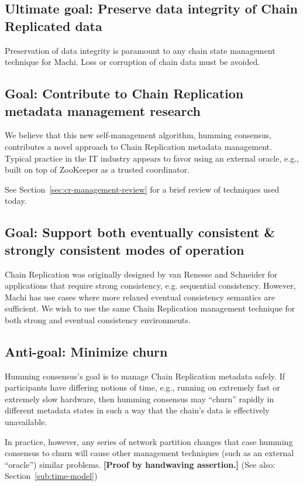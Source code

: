\documentclass[preprint,10pt]{sigplanconf}
\begin{document}
\subsection{Ultimate goal: Preserve data integrity of Chain Replicated data}

Preservation of data integrity is paramount to any chain state
management technique for Machi.  Loss or corruption of chain data must
be avoided.

\subsection{Goal: Contribute to Chain Replication metadata management research}

We believe that this new self-management algorithm, humming consensus,
contributes a novel approach to Chain Replication metadata management.
Typical practice in the IT industry appears to favor using an external
oracle, e.g., built on top of ZooKeeper as a trusted coordinator.  

See Section~\ref{sec:cr-management-review} for a brief review of
techniques used today.

\subsection{Goal: Support both eventually consistent \& strongly consistent modes of operation}

Chain Replication was originally designed by van Renesse and Schneider
\cite{chain-replication} for applications that require strong
consistency, e.g. sequential consistency.  However, Machi has use
cases where more relaxed eventual consistency semantics are
sufficient.  We wish to use the same Chain Replication management
technique for both strong and eventual consistency environments.

\subsection{Anti-goal: Minimize churn}

Humming consensus's goal is to manage Chain Replication metadata
safely.  If participants have differing notions of time, e.g., running
on extremely fast or extremely slow hardware, then humming consensus
may ``churn'' rapidly in different metadata states in such a way that
the chain's data is effectively unavailable.  

In practice, however, any series of network partition changes that
case humming consensus to churn will cause other management techniques
(such as an external ``oracle'') similar problems.
{\bf [Proof by handwaving assertion.]}
(See also: Section~\ref{sub:time-model})
\end{document}
